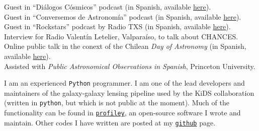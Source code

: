 \documentclass[11pt]{article}
\begin{document}
\noindent
{} Guest in ``Di\'alogos C\'osmicos'' podcast (in Spanish, available \href{https://www.youtube.com/watch?v=6hFChKVBkH8&pp=ygURZGlhbG9nb3MgY29zbWljb3M%3D}{here}).\\
 Guest in ``Conversemos de Astronomía'' podcast (in Spanish, available \href{https://open.spotify.com/episode/4PBTlnI3ufDtBwXIGee5mp?si=KGS43HFnSuiVdVPYaoBMqA}{here}).\\
 Guest in ``Rockstars'' podcast by Radio TXS (in Spanish, available \href{https://soundcloud.com/txsplus/rockstars-con-gabriel-leon-y-cristobal-sifon-4-de-noviembre-del-2022?utm_source=Email&utm_campaign=social_sharing&utm_medium=widgetutm_content=https%3A%2F%2Fsoundcloud.com%2Ftxsplus%2Frockstars-con-gabriel-leon-y-cristobal-sifon-4-de-noviembre-del-2022}{here}).\\
 Interview for Radio Valent\'in Letelier, Valparaíso, to talk about CHANCES.\\
 Online public talk in the conext of the Chilean \textit{Day of Astronomy} (in Spanish, available \href{https://www.youtube.com/watch?v=MgrKSd6JWkE}{here}).\\
 Assisted with \emph{Public Astronomical Observations in Spanish}, Princeton University.\\

\pagebreak



\noindent
I am an experienced \texttt{Python} programmer. 
I am one of the lead 
developers and maintainers of the galaxy-galaxy lensing pipeline used by the 
KiDS collaboration (written in \texttt{python}, but which is not public at the 
moment). Much of the functionality can be found in \href{https://profiley.readthedocs.io/en/latest/index.html}{\texttt{profiley}}, an open-source software I wrote and maintain. Other codes I have written are posted at my \href{https://github.com/cristobal-sifon}{\texttt{github}} page.\\
\end{document}
